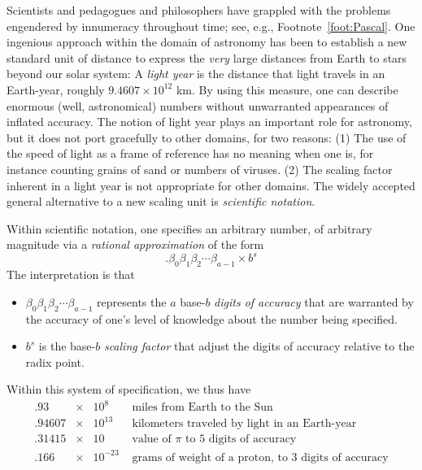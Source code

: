 Scientists and pedagogues and philosophers have grappled with the
problems engendered by innumeracy throughout time; see, e.g.,
Footnote~\ref{foot:Pascal}.  One ingenious approach within the domain
of astronomy has been to establish a new standard unit of distance to
express the {\em very} large distances from Earth to stars beyond our
solar system: A {\em light year} is the distance that light travels in
an Earth-year, roughly $9.4607 \times 10^{12}$ km.  By using this
measure, one can describe enormous (well, astronomical) numbers
without unwarranted appearances of inflated accuracy.  The notion of
light year plays an important role for astronomy, but it does not port
gracefully to other domains, for two reasons: (1) The use of the speed
of light as a frame of reference has no meaning when one is, for
instance counting grains of sand or numbers of viruses.  (2) The
scaling factor inherent in a light year is not appropriate for other
domains.  The widely accepted general alternative to a new scaling
unit is {\em scientific notation}.  

Within scientific notation, one specifies an arbitrary number, of
arbitrary magnitude via a {\em rational approximation} of the form
\[ . \beta_0 \beta_1 \beta_2 \cdots \beta_{a-1} \times b^s \]
The interpretation is that
\begin{itemize}
\item
$\beta_0 \beta_1 \beta_2 \cdots \beta_{a-1}$ represents the $a$
  base-$b$ {\em digits of accuracy} that are warranted by the accuracy
  of one's level of knowledge about the number being specified.

\item
$b^s$ is the base-$b$ {\em scaling factor} that adjust the digits of
  accuracy relative to the radix point.
\end{itemize}
Within this system of specification, we thus have
\[ \begin{array}{lcll}
.93    & \times & 10^8     & \mbox{ miles from Earth to the Sun} \\
.94607 & \times & 10^{13}  & \mbox{ kilometers traveled by light in an Earth-year} \\
.31415 & \times & 10       & \mbox{ value of $\pi$ to $5$ digits of accuracy} \\
.166   & \times & 10^{-23} & \mbox{ grams of weight of a proton, to $3$ digits of accuracy}
\end{array}
\]

